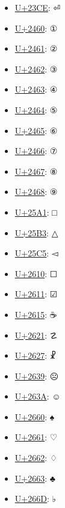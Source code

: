 \begin{itemize}
	\item \href{https://www.compart.com/en/unicode/U+23CE}{U+23CE}: ⏎
	\item \href{https://www.compart.com/en/unicode/U+2460}{U+2460}: ①
	\item \href{https://www.compart.com/en/unicode/U+2461}{U+2461}: ②
	\item \href{https://www.compart.com/en/unicode/U+2462}{U+2462}: ③
	\item \href{https://www.compart.com/en/unicode/U+2463}{U+2463}: ④
	\item \href{https://www.compart.com/en/unicode/U+2464}{U+2464}: ⑤
	\item \href{https://www.compart.com/en/unicode/U+2465}{U+2465}: ⑥
	\item \href{https://www.compart.com/en/unicode/U+2466}{U+2466}: ⑦
	\item \href{https://www.compart.com/en/unicode/U+2467}{U+2467}: ⑧
	\item \href{https://www.compart.com/en/unicode/U+2468}{U+2468}: ⑨
	\item \href{https://www.compart.com/en/unicode/U+25A1}{U+25A1}: □
	\item \href{https://www.compart.com/en/unicode/U+25B3}{U+25B3}: △
	\item \href{https://www.compart.com/en/unicode/U+25C5}{U+25C5}: ◅
	\item \href{https://www.compart.com/en/unicode/U+2610}{U+2610}: ☐
	\item \href{https://www.compart.com/en/unicode/U+2611}{U+2611}: ☑
	\item \href{https://www.compart.com/en/unicode/U+2615}{U+2615}: ☕
	\item \href{https://www.compart.com/en/unicode/U+2621}{U+2621}: ☡
	\item \href{https://www.compart.com/en/unicode/U+2627}{U+2627}: ☧
	\item \href{https://www.compart.com/en/unicode/U+2639}{U+2639}: ☹
	\item \href{https://www.compart.com/en/unicode/U+263A}{U+263A}: ☺
	\item \href{https://www.compart.com/en/unicode/U+2660}{U+2660}: ♠
	\item \href{https://www.compart.com/en/unicode/U+2661}{U+2661}: ♡
	\item \href{https://www.compart.com/en/unicode/U+2662}{U+2662}: ♢
	\item \href{https://www.compart.com/en/unicode/U+2663}{U+2663}: ♣
	\item \href{https://www.compart.com/en/unicode/U+266D}{U+266D}: ♭

\end{itemize}
